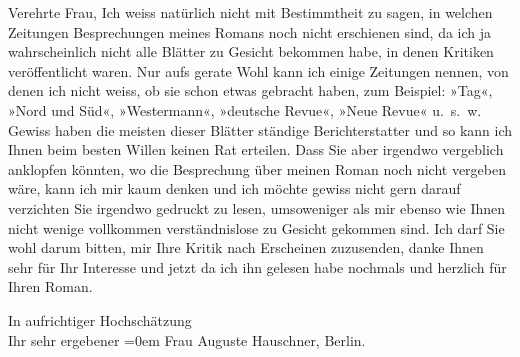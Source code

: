\pstart{}Verehrte Frau,\pend\vspace{0.5em}
\pstart
           Ich weiss natürlich nicht mit Bestimmtheit zu sagen, in welchen Zeitungen
               Besprechungen meines Romans
               noch nicht erschienen sind, da ich ja wahrscheinlich nicht alle Blätter zu Gesicht
               bekommen habe, in denen Kritiken veröffentlicht waren. Nur aufs gerate Wohl kann ich
               einige Zeitungen nennen, von
               denen ich nicht weiss, ob sie schon etwas gebracht haben, zum Beispiel: »Tag«, »Nord und
                  Süd«, »Westermann«, »deutsche Revue«, »Neue
                  Revue« u. s. w. Gewiss haben die meisten dieser Blätter ständige Berichterstatter und so kann ich Ihnen beim besten Willen
               keinen Rat erteilen. Dass Sie aber irgendwo vergeblich anklopfen könnten, wo die
               Besprechung über meinen Roman
               noch nicht vergeben wäre, kann ich mir kaum denken und ich möchte gewiss nicht gern
               darauf verzichten Sie irgendwo gedruckt zu lesen, umsoweniger als mir ebenso wie
               Ihnen nicht wenige vollkommen verständnislose zu Gesicht gekommen sind. Ich darf Sie
               wohl darum bitten, mir Ihre Kritik nach Erscheinen zuzusenden, danke Ihnen sehr für Ihr Interesse und
               jetzt da ich ihn gelesen habe {\pb}nochmals und herzlich für
               Ihren Roman.\pend
           
\pstart
           In aufrichtiger Hochschätzung{\\[\baselineskip]}Ihr sehr ergebener\pend
           \leftskip=0em{}{\vspace{1\baselineskip}}
\pstart
           \noindent{}Frau Auguste Hauschner, Berlin.\pend
           \endnumbering{}  
      